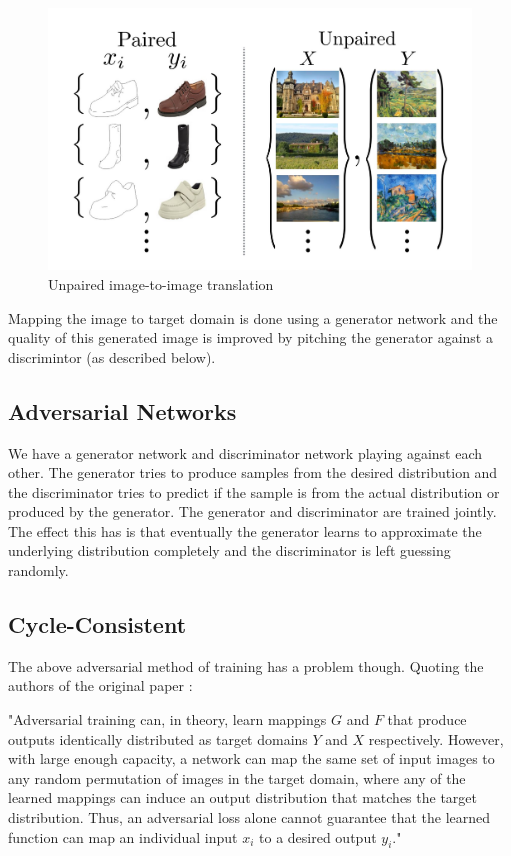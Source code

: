 \documentclass[peerreview]{IEEEtran}
\begin{document}
\begin{figure}[H]
    \centering
    \includegraphics[width=0.8\columnwidth]{img_translation.JPG}
    \caption{Unpaired image-to-image translation}
    \label{fig:s=unpaired-img-to-img}
\end{figure}

Mapping the image to target domain is done using a generator network and the quality of this generated image is improved by pitching the generator against a discrimintor (as described below).

\subsection*{Adversarial Networks}
\qquad We have a generator network and discriminator network playing against each other. The generator tries to produce samples from the desired distribution and the discriminator tries to predict if the sample is from the actual distribution or produced by the generator. The generator and discriminator are trained jointly. The effect this has is that eventually the generator learns to approximate the underlying distribution completely and the discriminator is left guessing randomly.

\subsection*{Cycle-Consistent}
 The above adversarial method of training has a problem though. Quoting the authors of the original paper \cite{zhu2017unpaired}:

"Adversarial training can, in theory, learn mappings $G$ and $F$ that produce outputs identically distributed as target domains $Y$ and $X$ respectively. However, with large enough capacity, a network can map the same set of input images to any random permutation of images in the target domain, where any of the learned mappings can induce an output distribution that matches the target distribution. Thus, an adversarial loss alone cannot guarantee that the learned function can map an individual input $x_i$ to a desired output $y_i$."
\end{document}
